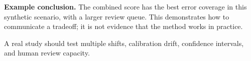 \textbf{Example conclusion.} The combined score has the best error coverage in this synthetic scenario, with a larger review queue. This demonstrates how to communicate a tradeoff; it is not evidence that the method works in practice.

\vspace{6mm}A real study should test multiple shifts, calibration drift, confidence intervals, and human review capacity.
